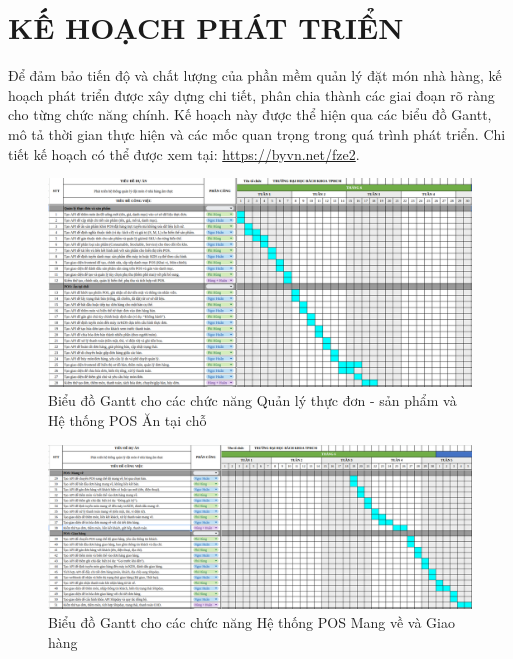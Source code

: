 \section{KẾ HOẠCH PHÁT TRIỂN}

Để đảm bảo tiến độ và chất lượng của phần mềm quản lý đặt món nhà hàng, kế hoạch phát triển được xây dựng chi tiết, phân chia thành các giai đoạn rõ ràng cho từng chức năng chính. Kế hoạch này được thể hiện qua các biểu đồ Gantt, mô tả thời gian thực hiện và các mốc quan trọng trong quá trình phát triển. Chi tiết kế hoạch có thể được xem tại: \url{https://byvn.net/fze2}.

\begin{figure}[H]
    \centering
    \includegraphics[width=\linewidth]{Images/gantt_1}
    \vspace{0.5cm}
    \caption{Biểu đồ Gantt cho các chức năng Quản lý thực đơn - sản phẩm và Hệ thống POS Ăn tại chỗ}
    \label{fig:gantt_menu_pos}
\end{figure}

\begin{figure}[H]
    \centering
    \includegraphics[width=\linewidth]{Images/gantt_2}
    \vspace{0.5cm}
    \caption{Biểu đồ Gantt cho các chức năng Hệ thống POS Mang về và Giao hàng}
    \label{fig:gantt_takeaway_delivery}
\end{figure}


